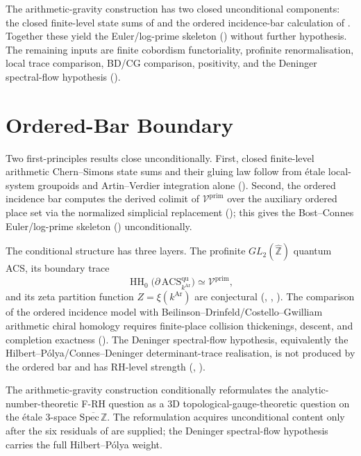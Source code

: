 The arithmetic-gravity construction has two closed unconditional components:
the closed finite-level state sums of
 and the ordered
incidence-bar calculation of .
Together these yield the Euler/log-prime skeleton
() without further
hypothesis. The remaining inputs are finite cobordism functoriality,
profinite renormalisation, local trace comparison, BD/CG comparison,
positivity, and the Deninger spectral-flow hypothesis
().

\section{Ordered-Bar Boundary}
\label{v4-arith:3d-acs:summary}

Two first-principles results close unconditionally. First, closed
finite-level arithmetic Chern--Simons state sums and their gluing law
follow from étale local-system groupoids and Artin--Verdier integration
alone (). Second, the
ordered incidence bar computes the derived colimit of
\(\mathcal V^{\mathrm{prim}}\) over the auxiliary ordered place set via
the normalized simplicial replacement
(); this gives the
Bost--Connes Euler/log-prime skeleton ()
unconditionally.

The conditional structure has three layers. The profinite
\(GL_2(\widehat{\mathbb Z})\) quantum ACS, its boundary trace
\[
\operatorname{HH}_{0}
\bigl(\partial\,\mathrm{ACS}^{\mathrm{qu}}_{k^{\mathrm{Ar}}}\bigr)
\simeq \mathcal V^{\mathrm{prim}},
\]
and its zeta partition function \(Z = \xi(k^{\mathrm{Ar}})\) are
conjectural (,
,
). The comparison of the
ordered incidence model with Beilinson--Drinfeld/Costello--Gwilliam
arithmetic chiral homology requires finite-place collision thickenings,
descent, and completion exactness
(). The
Deninger spectral-flow hypothesis, equivalently the
Hilbert--P\'olya/Connes--Deninger determinant-trace realisation, is not
produced by the ordered bar and has RH-level strength
(,
).

The arithmetic-gravity construction conditionally reformulates the
analytic-number-theoretic F-RH question as a 3D
topological-gauge-theoretic question on the étale 3-space
\(\overline{\mathrm{Spec}\,\mathbb{Z}}\). The reformulation acquires
unconditional content only after the six residuals of
 are supplied; the Deninger spectral-flow
hypothesis carries the full Hilbert--P\'olya weight.
